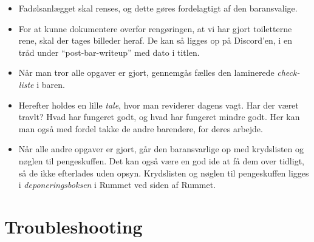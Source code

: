 \begin{itemize}
    \item Fadølsanlægget skal renses, og dette gøres fordelagtigt af den baransvalige.
    \item For at kunne dokumentere overfor rengøringen, at vi har gjort toiletterne rene,
    skal der tages billeder heraf. De kan så ligges op på Discord'en, i en tråd under
    ``post-bar-writeup'' med dato i titlen.
    \item Når man tror alle opgaver er gjort, 
    gennemgås fælles den laminerede \textit{check-liste} i baren.
    \item Herefter holdes en lille \textit{tale}, hvor man reviderer dagens vagt. 
    Har der været travlt? Hvad har fungeret godt, og hvad har fungeret mindre godt.
    Her kan man også med fordel takke de andre barendere, for deres arbejde.
    \item Når alle andre opgaver er gjort, går den baransvarlige op med krydslisten og nøglen til pengeskuffen.
    Det kan også være en god ide at få dem over tidligt, så de ikke efterlades uden opsyn.
    Krydslisten og nøglen til pengeskuffen ligges i \textit{deponeringsboksen} 
    i Rummet ved siden af Rummet. 
\end{itemize}

\newpage
\section{Troubleshooting}
\label{sec:troubleshooting}

